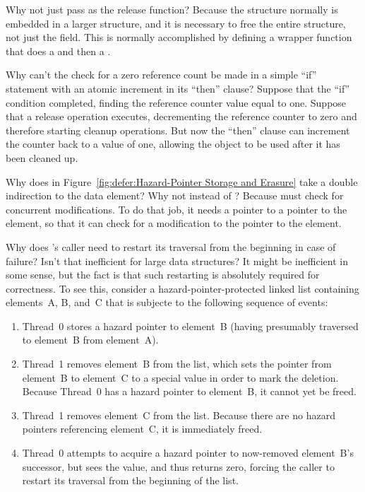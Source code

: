 \QuickQ{}
	Why not just pass  as the release function?
\QuickA{}
	Because the  structure normally is embedded in
	a larger structure, and it is necessary to free the entire
	structure, not just the  field.
	This is normally accomplished by defining a wrapper function
	that does a  and then a .

\QuickQ{}
	Why can't the check for a zero reference count be
	made in a simple ``if'' statement with an atomic
	increment in its ``then'' clause?
\QuickA{}
	Suppose that the ``if'' condition completed, finding
	the reference counter value equal to one.
	Suppose that a release operation executes, decrementing
	the reference counter to zero and therefore starting
	cleanup operations.
	But now the ``then'' clause can increment the counter
	back to a value of one, allowing the object to be
	used after it has been cleaned up.

\QuickQ{}
	Why does  in
	Figure~\ref{fig:defer:Hazard-Pointer Storage and Erasure}
	take a double indirection to the data element?
	Why not  instead of ?
\QuickA{}
	Because  must check for concurrent modifications.
	To do that job, it needs a pointer to a pointer to the element,
	so that it can check for a modification to the pointer to the
	element.

\QuickQ{}
	Why does 's caller need to restart its
	traversal from the beginning in case of failure?
	Isn't that inefficient for large data structures?
\QuickA{}
	It might be inefficient in some sense, but the fact is that
	such restarting is absolutely required for correctness.
	To see this, consider a hazard-pointer-protected linked list
	containing elements~A, B, and~C that is subjecte to the
	following sequence of events:

	\begin{enumerate}
	\item	Thread~0 stores a hazard pointer to element~B
		(having presumably traversed to element~B from element~A).
	\item	Thread~1 removes element~B from the list, which sets
		the pointer from element~B to element~C to a special
		 value in order to mark the deletion.
		Because Thread~0 has a hazard pointer to element~B,
		it cannot yet be freed.
	\item	Thread~1 removes element~C from the list.
		Because there are no hazard pointers referencing element~C,
		it is immediately freed.
	\item	Thread~0 attempts to acquire a hazard pointer to
		now-removed element~B's successor, but sees the
		 value, and thus returns zero,
		forcing the caller to restart its traversal from the
		beginning of the list.
	\end{enumerate}

